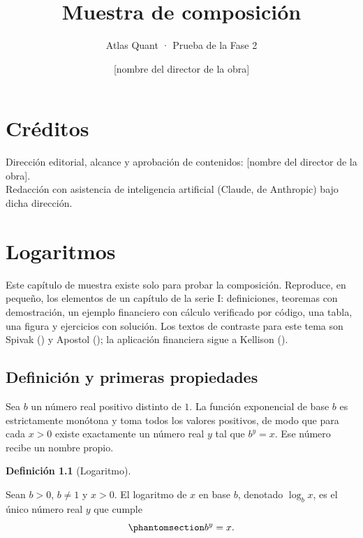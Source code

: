 \documentclass[
  spanish,
  letterpaper,
  a4paper,
  11pt,
  oneside,
  numbers=noenddot]{scrbook}
\title{Muestra de composición}
\subtitle{Atlas Quant · Prueba de la Fase 2}
\author{{[}nombre del director de la obra{]}}
\date{}
\renewcommand*\contentsname{Tabla de contenidos}
\newcommand\contentsname{Tabla de contenidos}
\theoremstyle{definition}
\newtheorem{definition}{Definición}[chapter]
\theoremstyle{plain}
\theoremstyle{definition}
\theoremstyle{definition}
\theoremstyle{plain}
\theoremstyle{remark}
\begin{document}
\frontmatter
\maketitle

\renewcommand*\contentsname{Tabla de contenidos}
{
\setcounter{tocdepth}{1}
\tableofcontents
}

\mainmatter
{}

\chapter*{Créditos}\label{cruxe9ditos}


Dirección editorial, alcance y aprobación de contenidos: {[}nombre del
director de la obra{]}.\\
Redacción con asistencia de inteligencia artificial (Claude, de
Anthropic) bajo dicha dirección.


\chapter{Logaritmos}\label{sec-logaritmos}

Este capítulo de muestra existe solo para probar la composición.
Reproduce, en pequeño, los elementos de un capítulo de la serie I:
definiciones, teoremas con demostración, un ejemplo financiero con
cálculo verificado por código, una tabla, una figura y ejercicios con
solución. Los textos de contraste para este tema son Spivak
() y Apostol
(); la aplicación financiera sigue a
Kellison ().

\section{Definición y primeras propiedades}\label{sec-log-definicion}

Sea \(b\) un número real positivo distinto de \(1\). La función
exponencial de base \(b\) es estrictamente monótona y toma todos los
valores positivos, de modo que para cada \(x > 0\) existe exactamente un
número real \(y\) tal que \(b^{y} = x\). Ese número recibe un nombre
propio.

\begin{definition}[Logaritmo]\protect\hypertarget{def-logaritmo}{}\label{def-logaritmo}

Sean \(b > 0\), \(b \neq 1\) y \(x > 0\). El
logaritmo de \(x\) en base \(b\), denotado
\(\log_b x\), es el único número real \(y\) que cumple
\begin{equation}\protect\phantomsection\label{eq-def-log}{
b^{y} = x .
}\end{equation}

\end{definition}
\end{document}
